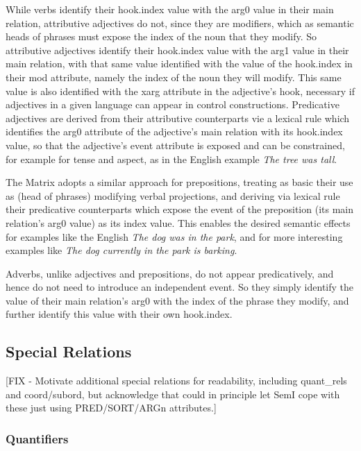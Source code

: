 \documentclass[12pt]{article}
\begin{document}
While verbs identify their {\sc hook.index} value with the {\sc arg0} value in
their main relation, attributive adjectives do not, since they are modifiers, 
which as semantic heads of phrases must expose the index of the noun
that they modify.  So attributive adjectives identify their {\sc hook.index}
value with the {\sc arg1} value in their main relation, with that same value
identified with the value of the {\sc hook.index} in their {\sc mod} attribute,
namely the index of the noun they will modify.  This same value is also
identified with the {\sc xarg} attribute in the adjective's {\sc hook},
necessary if adjectives in a given language can appear in control
constructions.  Predicative adjectives are derived from their attributive
counterparts vie a lexical rule which identifies the {\sc arg0} attribute
of the adjective's main relation with its {\sc hook.index} value, so that the
adjective's event attribute is exposed and can be constrained, for example for
tense and aspect, as in the English example {\it The tree was tall}.

The Matrix adopts a similar approach for prepositions, treating as basic their
use as (head of phrases) modifying verbal projections, and deriving via lexical
rule their predicative counterparts which expose the event of the preposition
(its main relation's {\sc arg0} value) as its {\sc index} value.  This enables
the desired semantic effects for examples like the English {\it The dog was
in the park}, and for more interesting examples like {\it The dog currently
in the park is barking}.

Adverbs, unlike adjectives and prepositions, do not appear predicatively, and
hence do not need to introduce an independent event.  So they simply identify
the value of their main relation's {\sc arg0} with the index of the phrase
they modify, and further identify this value with their own {\sc hook.index}.

\subsection{Special Relations}

[FIX - Motivate additional special relations for readability, including
quant\_rels and coord/subord, but acknowledge that could in principle let
SemI cope with these just using PRED/SORT/ARGn attributes.]

\subsubsection{Quantifiers}
\label{quantsec}
\end{document}
